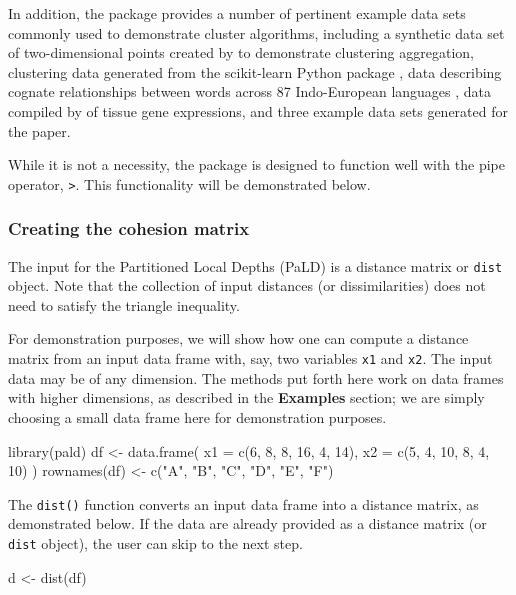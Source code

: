 In addition, the package provides a number of pertinent example data
sets commonly used to demonstrate cluster algorithms, including a
synthetic data set of two-dimensional points created by
\citet{gionis1clustering} to demonstrate clustering aggregation,
clustering data generated from the scikit-learn Python package
\citep{pedregosa2011scikit}, data describing cognate relationships
between words across 87 Indo-European languages \citep{dyen92}, data
compiled by \cite{tissue} of tissue gene expressions, and three example
data sets generated for the \citet{berenhaut2022social} paper.

While it is not a necessity, the  package is designed to
function well with the pipe operator, \texttt{\textbar{}\textgreater{}}.
This functionality will be demonstrated below.

\hypertarget{creating-the-cohesion-matrix}{%
\subsubsection{Creating the cohesion
matrix}\label{creating-the-cohesion-matrix}}

The input for the Partitioned Local Depths (PaLD) is a distance matrix
or \texttt{dist} object. Note that the collection of input distances (or
dissimilarities) does not need to satisfy the triangle inequality.

For demonstration purposes, we will show how one can compute a distance
matrix from an input data frame with, say, two variables \texttt{x1} and
\texttt{x2}. The input data may be of any dimension. The methods put
forth here work on data frames with higher dimensions, as described in
the \textbf{Examples} section; we are simply choosing a small data frame
here for demonstration purposes.

\begin{Schunk}
\begin{Sinput}
library(pald)
df <- data.frame(
  x1 = c(6, 8, 8, 16, 4, 14),
  x2 = c(5, 4, 10, 8, 4, 10)
)
rownames(df) <- c("A", "B", "C", "D", "E", "F")
\end{Sinput}
\end{Schunk}

The \texttt{dist()} function converts an input data frame into a
distance matrix, as demonstrated below. If the data are already provided
as a distance matrix (or \texttt{dist} object), the user can skip to the
next step.

\begin{Schunk}
\begin{Sinput}
d <- dist(df)
\end{Sinput}
\end{Schunk}

